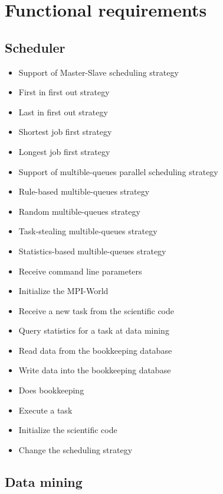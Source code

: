 {


\setcounter{func}{10}
\renewcommand{\labelitemi}{
	\ifnum \value{func}<10$/F 0\arabic{func} /$\addtocounter{func}{10}
	\else $/F \arabic{func} /$\addtocounter{func}{10}\fi
	}

\section{Functional requirements} 
	
	\subsection{Scheduler}
	
		\begin{itemize}
			\item Support of Master-Slave scheduling strategy
			\item First in first out strategy
			\item Last in first out strategy
			\item Shortest job first strategy
			\item Longest job first strategy 
			\item Support of multible-queues parallel scheduling strategy
			\item Rule-based multible-queues strategy
			\item Random multible-queues strategy
			\item Task-stealing multible-queues strategy
			\item Statistics-based multible-queues strategy
			\item Receive command line parameters
			\item Initialize the MPI-World 
			\item Receive a new task from the scientific code
			\item Query statistics for a task at data mining
			\item Read data from the bookkeeping database
			\item Write data into the bookkeeping database
			\item Does bookkeeping
			\item Execute a task
			\item Initialize the scientific code
			\item Change the scheduling strategy
		\end{itemize}
	
	
	\subsection{Data mining}
	
}
